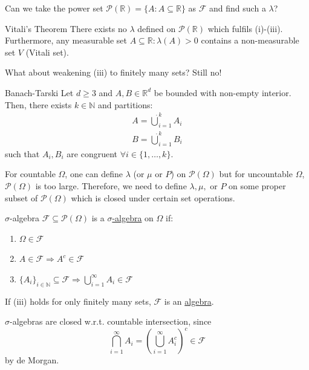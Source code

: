 \documentclass{article}
\begin{document}
	Can we take the power set $\mathcal{P}(\mathbb{R})=\{A : A\subseteq \mathbb{R}\}$ as $\mathcal{F}$ and find such a $\lambda$?
	
	\begin{mythm}{Vitali's Theorem}{}
		There exists no $\lambda$ defined on $\mathcal{P}(\mathbb{R})$ which fulfils (i)-(iii). Furthermore, any measurable set $A\subseteq\mathbb{R}: \lambda(A)>0$ contains a non-measurable set $V$ (Vitali set). 
	\end{mythm}
	
	What about weakening (iii) to finitely many sets? Still no!
	
	\begin{mythm}{Banach-Tarski}{}
		Let $d\geq 3$ and $A, B\in \mathbb{R}^d$ be bounded with non-empty interior. Then, there exists $k\in\mathbb{N}$ and partitions:
		\begin{align*}
			A=\dot\bigcup_{i=1}^kA_i\\
			B=\dot\bigcup_{i=1}^kB_i
		\end{align*}
		such that $A_i, B_i$ are congruent $\forall i\in \{1,\dots, k\}$.
	\end{mythm}
	
	For countable $\Omega$, one can define $\lambda$ (or $\mu$ or $P$) on $\mathcal{P}(\Omega)$ but for uncountable $\Omega$, $\mathcal{P}(\Omega)$ is too large. Therefore, we need to define $\lambda, \mu,$ or  $P$ on some proper subset of $\mathcal{P}(\Omega)$ which is closed under certain set operations.
	
	\begin{mydef}{$\sigma$-algebra}{}
		$\mathcal{F}\subseteq\mathcal{P}(\Omega)$ is a \underline{$\sigma$-algebra} on $\Omega$ if:
		\begin{enumerate}[label=(\roman*)]
			\item $\Omega\in\mathcal{F}$
			\item $A\in\mathcal{F}\Rightarrow A^c\in\mathcal{F}$
			\item $\{A_i\}_{i\in\mathbb{N}}\subseteq\mathcal{F}\Rightarrow\bigcup_{i=1}^{\infty}A_i\in\mathcal{F}$
		\end{enumerate}
		If (iii) holds for only finitely many sets, $\mathcal{F}$ is an \underline{algebra}.
	\end{mydef}
	
	\begin{myrem}{}{}
		$\sigma$-algebras are closed w.r.t. countable intersection, since
		\begin{equation*}
			\bigcap_{i=1}^{\infty}A_i=(\bigcup_{i=1}^{\infty}A_i^c)^c\in\mathcal{F}
		\end{equation*}
		by de Morgan.
	\end{myrem}
	
\end{document}

